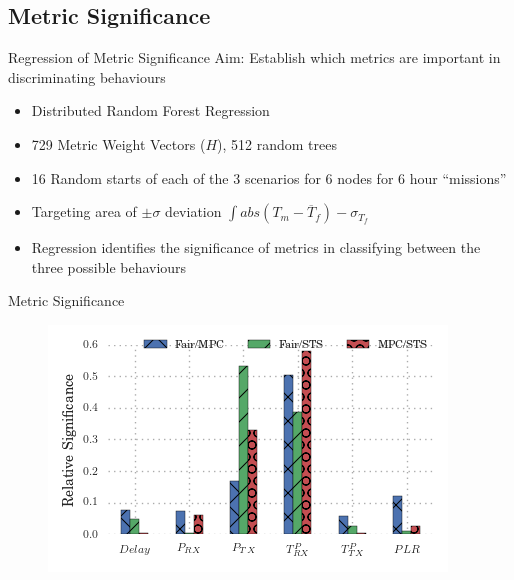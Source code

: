 \documentclass{beamer}
\begin{document}
\subsection{Metric Significance}
\begin{frame}{Regression of Metric Significance}
  Aim: Establish which metrics are important in discriminating behaviours
  \pause
  \begin{itemize}
    \item Distributed Random Forest Regression \autocite{Breiman2001} 
    \item 729 Metric Weight Vectors ($H$), 512 random trees
    \item 16 Random starts of each of the 3 scenarios for 6 nodes for 6 hour ``missions''
    \item Targeting area of $\pm\sigma$ deviation $\int abs(T_m - \overline T_f) - \sigma_{T_f}$
    \item Regression identifies the significance of metrics in classifying between the three possible behaviours
  \end{itemize}

\end{frame}
\begin{frame}{Metric Significance}

  \begin{figure}
    \centering
    \includegraphics[width=0.95\linewidth]{img/MaliciousSelfishMetricFactors}
    \label{fig:malselfactors}
  \end{figure}
\end{frame}
\end{document}
